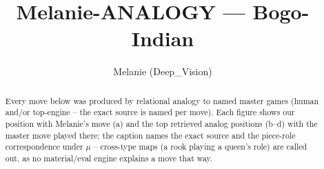 \documentclass[11pt]{article}
\title{Melanie-ANALOGY — Bogo-Indian}
\author{Melanie (Deep\_Vision)}
\date{}
\begin{document}
\maketitle

\begin{abstract}Every move below was produced by relational analogy to named master games (human and/or top-engine -- the exact source is named per move). Each figure shows our position with Melanie's move (a) and the top retrieved analog positions (b--d) with the master move played there; the caption names the exact source and the piece-role correspondence under $\mu$ -- cross-type maps (a rook playing a queen's role) are called out, as no material/eval engine explains a move that way.\end{abstract}

\begin{figure}[p]\centering
\begin{subfigure}{0.46\textwidth}\centering
\resizebox{\linewidth}{!}{%
\newchessgame
\chessboard[
  setfen={r1b1k2r/ppppqppp/2n1pn2/8/2PP4/2b2NP1/PP1BPP1P/R2QKB1R w KQkq - 0 7},
  showmover=false,
  pgfstyle=straightmove, color=movearrow, markmove={d2-c3}
]}
\caption{}
\end{subfigure}\hfill
\begin{subfigure}{0.46\textwidth}\centering
\resizebox{\linewidth}{!}{%
\newchessgame
\chessboard[
  setfen={r1b1k2r/ppppqppp/2n1pn2/8/2PP4/2b2NP1/PP1BPP1P/R2QKB1R w KQkq - 0 7},
  showmover=false,
  pgfstyle=straightmove, color=movearrow, markmove={d2-c3}
]}
\caption{}
\end{subfigure}
\\[4pt]
\begin{subfigure}{0.46\textwidth}\centering
\resizebox{\linewidth}{!}{%
\newchessgame
\chessboard[
  setfen={r1b1k2r/ppppqppp/2n1pn2/8/2PP4/2b2NP1/PP1BPP1P/R2QKB1R w KQkq - 0 7},
  showmover=false,
  pgfstyle=straightmove, color=movearrow, markmove={d2-c3}
]}
\caption{}
\end{subfigure}\hfill
\begin{subfigure}{0.46\textwidth}\centering
\resizebox{\linewidth}{!}{%
\newchessgame
\chessboard[
  setfen={r1b1k2r/ppppqppp/2n1pn2/8/2PP4/2b2NP1/PP1BPP1P/R2QKB1R w KQkq - 0 7},
  showmover=false,
  pgfstyle=straightmove, color=movearrow, markmove={d2-c3}
]}
\caption{}
\end{subfigure}

\end{figure}
\end{document}
